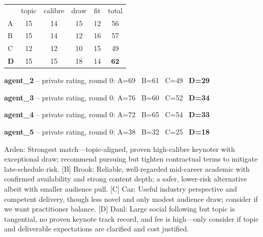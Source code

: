 \begin{tcolorbox}
\renewcommand{\arraystretch}{1.05}
\begin{tabular}{lccccc}
 & topic & calibre & draw & fit & total \\
A & 15 & 14 & 15 & 12 & 56 \\
B & 15 & 14 & 12 & 16 & 57 \\
C & 12 & 12 & 10 & 15 & 49 \\
\textbf{D} & 15 & 15 & 18 & 14 & $\mathbf{62}$ \\
\end{tabular}
\end{tcolorbox}

\begin{tcolorbox}
\textbf{agent\_2} -- private rating, round 0: A=69 \, B=61 \, C=49 \, \textbf{D=29}
\end{tcolorbox}

\begin{tcolorbox}
\textbf{agent\_3} -- private rating, round 0: A=76 \, B=60 \, C=52 \, \textbf{D=34}
\end{tcolorbox}

\begin{tcolorbox}
\textbf{agent\_4} -- private rating, round 0: A=72 \, B=65 \, C=54 \, \textbf{D=33}
\end{tcolorbox}

\begin{tcolorbox}
\textbf{agent\_5} -- private rating, round 0: A=38 \, B=32 \, C=25 \, \textbf{D=18}
\end{tcolorbox}

\begin{tcolorbox}[mbox-neutral={agent\_3 -- discussion r1}]
[A] Arden: Strongest match---topic-aligned, proven high-calibre keynoter with exceptional draw; recommend pursuing but tighten contractual terms to mitigate late-schedule risk.  
[B] Brook: Reliable, well-regarded mid-career academic with confirmed availability and strong content depth; a safer, lower-risk alternative albeit with smaller audience pull.  
[C] Caz: Useful industry perspective and competent delivery, though less novel and only modest audience draw; consider if we want practitioner balance.  
[D] Danl: Large social following but topic is tangential, no proven keynote track record, and fee is high---only consider if topic and deliverable expectations are clarified and cost justified.
\end{tcolorbox}


